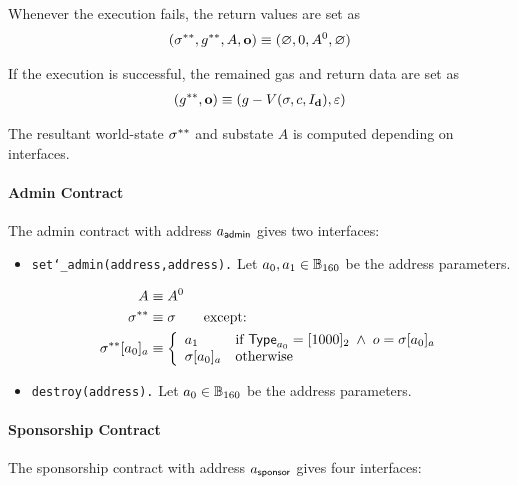 Whenever the execution fails, the return values are set as
\begin{align}
	\left(\mathbf{\sigma}^{**}, g^{**},  A, \mathbf{o} \right)\equiv (\varnothing,0,A^0,\varnothing)
\end{align} 

If the execution is successful, the remained gas and return data are set as 
\begin{align}
	\left(g^{**}, \mathbf{o} \right)\equiv (g-V(\mathbf{\sigma},c,I_\mathbf{d}),\mathbb{\varepsilon})
\end{align}

The resultant world-state $\mathbf{\sigma}^{**}$ and substate $A$ is computed depending on interfaces. 


\paragraph{Admin Contract}
The admin contract with address $a_{\sf admin}$ gives two interfaces:
\begin{itemize}
	\item {\tt set\char`_admin(address,address).} Let $a_0,a_1\in \mathbb{B}_{160}$ be the address parameters. 
	\begin{itemize}
		\begin{align}
			A & \equiv A^0 \\
			\mathbf{\sigma}^{**} &\equiv \mathbf{\sigma} \qquad \mbox{except:}\\
			\mathbf{\sigma}^{**}[a_0]_a &\equiv \left\{\begin{array}{ll}
				a_1 & \text{if } \mathsf{Type}_{a_0} = [1000]_2 \;\wedge\; o = \mathbf{\sigma}[a_0]_a  \\ 
				\mathbf{\sigma}[a_0]_a & \mbox{otherwise}
			\end{array}\right. 
		\end{align}
	\end{itemize}
	\item {\tt destroy(address).} Let $a_0\in \mathbb{B}_{160}$ be the address parameters. 
\end{itemize}

\paragraph{Sponsorship Contract}
The sponsorship contract with address $a_{\sf sponsor}$ gives four interfaces:

